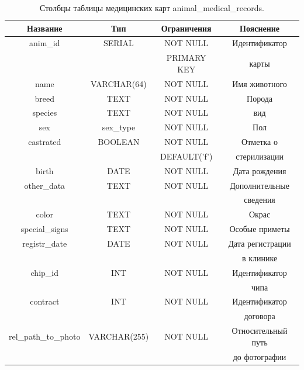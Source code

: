 \documentclass[a4paper,14pt]{article}
\begin{document}
\newpage
\begin{table}[!h]
	\caption{Столбцы таблицы медицинских карт animal\_medical\_records.}
	\begin{center}
		\begin{tabular}{| c | c | c | c |}
	 	\hline
		Название & Тип & Ограничения & Пояснение \\ \hline
		anim\_id & SERIAL & NOT NULL & Идентификатор \\
		 &  & PRIMARY KEY & карты \\ \hline
		name & VARCHAR(64) & NOT NULL & Имя животного \\ \hline
		breed & TEXT & NOT NULL & Порода \\ \hline
		species & TEXT & NOT NULL & вид \\ \hline
		sex & sex\_type & NOT NULL & Пол \\ \hline
		castrated & BOOLEAN & NOT NULL & Отметка о \\
		 &  & DEFAULT('f') & стерилизации \\ \hline
		birth & DATE & NOT NULL & Дата рождения \\ \hline
		other\_data & TEXT & NOT NULL & Дополнительные \\
		 &  &  & сведения \\ \hline
		color & TEXT & NOT NULL & Окрас \\ \hline
		special\_signs & TEXT & NOT NULL & Особые приметы \\ \hline
		registr\_date & DATE & NOT NULL & Дата регистрации \\
		 &  &  & в клинике \\ \hline
		chip\_id & INT & NOT NULL & Идентификатор \\
		 & &  & чипа \\ \hline
		contract & INT & NOT NULL & Идентификатор \\ \hline
		 &  & & договора \\ \hline
		rel\_path\_to\_photo & VARCHAR(255) & NOT NULL & Относительный путь \\
		 &  &  & до фотографии \\ \hline
	\end{tabular}
	\end{center}
\end{table}
\end{document}
